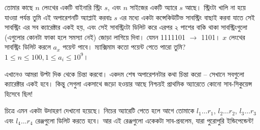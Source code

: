 \begin{example}
  তোমার কাছে $n$ লেংথের একটি বাইনারি স্ট্রিং $s$, এবং $n$ সাইজের একটি অ্যারে
  $s$ আছে। স্ট্রিংটা খালি না হয়ে যাওয়া পর্যন্ত তুমি এই অপারেশনটি অ্যাপ্লাই
  করবাঃ $s$ এর মধ্যে একটা কন্সেকিউটিভ সাবস্ট্রিং বাছাই করবা যাতে সেই
  সাবস্ট্রিং এর সব ক্যারেক্টার একই হয়, এবং সেই সাবস্ট্রিংটা ডিলিট করে এরপর ২
  পাশের বাকি থাকা সাবস্ট্রিংগুলো (এগুলোর কোনটা ফাকা হলে সমস্যা নেই) জোড়া
  লাগিয়ে দিবা। যেমন 1\colorbox{black!25}{111}101 $\rightarrow$ 1101। $x$
  লেংথের সাবস্ট্রিং ডিলিট করলে $a_x$ পয়েন্ট পাবে। ম্যাক্সিমাম কতো পয়েন্ট
  পেতে পারো তুমি? $1 \le n \le 100, 1 \le a_i \le 10^9$।
\end{example}
\begin{solution}
  এখানেও আমরা উল্টা দিক থেকে চিন্তা করবো। একদম শেষ অপারেশনটার কথা চিন্তা করো
  -- সেখানে সবগুলো ক্যারেক্টার একই হবে। কিন্তু সেগুলা একসাথে জড়ো হওয়ার আছে
  নিশ্চয়ই প্রাথমিক অ্যারেতে কোনো সাব-সিকুয়েন্স হিসেবে ছিল!
  \begin{figure}[h]
    \centering
  \end{figure}
  চিত্রে এমন একটা উদাহরণ দেখানো হয়েছে। নিচের অ্যারেটি পেতে হলে আগে তোমাকে
  $l_1 \ldots r_1$, $l_2 \ldots r_2$, $l_3 \ldots r_3$ এবং $l_4 \ldots r_4$
  রেঞ্জগুলো ডিলিট করতে হবে। আর এই রেঞ্জগুলো একেকটা সাব-প্রবলেম, যারা
  পুরোপুরি ইন্ডিপেন্ডেন্ট!


\end{solution}

